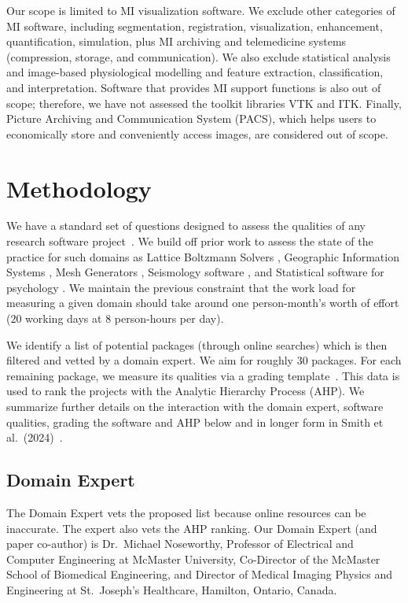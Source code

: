 \documentclass[draft, 12pt, 3p, times]{elsarticle} %
\begin{document}
Our scope is limited to MI visualization software.  We exclude other categories
of MI software, including segmentation, registration, visualization,
enhancement, quantification, simulation, plus MI archiving and telemedicine
systems (compression, storage, and communication).  We also exclude statistical
analysis and image-based physiological modelling and feature extraction,
classification, and interpretation. Software that provides MI support functions
is also out of scope; therefore, we have not assessed the toolkit libraries VTK
and ITK.  Finally, Picture Archiving and Communication System (PACS), which
helps users to economically store and conveniently access images, are considered
out of scope. 

\section{Methodology} \label{SecMethodology}

We have a standard set of questions designed to assess the qualities of any
research software project~\cite{SmithEtAl2021, SmithAndMichalski2022}. We build
off prior work to assess the state of the practice for such domains as Lattice
Boltzmann Solvers \cite{SmithEtAl2024}, Geographic Information Systems
\cite{smith2018state}, Mesh Generators \cite{smith2016state}, Seismology
software \cite{Smith2018Seismology}, and Statistical software for psychology
\cite{smith2018statistical}.  We maintain the previous constraint that the work
load for measuring a given domain should take around one person-month's worth of
effort ($20$ working days at $8$ person-hours per day).

We identify a list of potential packages (through online searches) which is then
filtered and vetted by a domain expert. We aim for roughly $30$ packages. For
each remaining package, we measure its qualities via a grading
template~\cite{SmithEtAl2021}.  This data is used to rank the projects with the
Analytic Hierarchy Process (AHP).  We summarize further details on the
interaction with the domain expert, software qualities, grading the software and
AHP below and in longer form in Smith et al.\
(2024)~\cite{SmithEtAl2024_MI_SOP}.

\subsection{Domain Expert} \label{sec_vet_software_list}

The Domain Expert vets the proposed list because online resources can be
inaccurate.  The expert also vets the AHP ranking.  Our Domain Expert (and paper
co-author) is Dr.\ Michael Noseworthy, Professor of Electrical and Computer
Engineering at McMaster University, Co-Director of the McMaster School of
Biomedical Engineering, and Director of Medical Imaging Physics and Engineering
at St.\ Joseph's Healthcare, Hamilton, Ontario, Canada.
\end{document}
